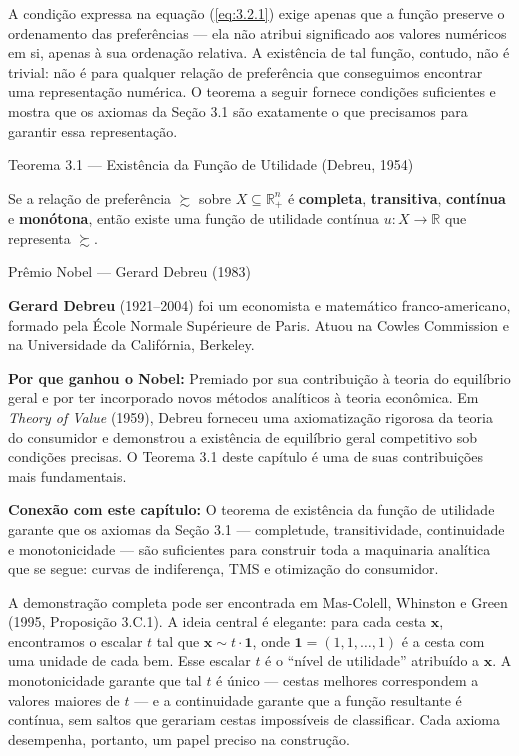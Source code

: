 \documentclass[11pt,twoside,openright]{book}
\begin{document}
A condição expressa na equação (\ref{eq:3.2.1}) exige apenas que a
função preserve o ordenamento das preferências --- ela não atribui
significado aos valores numéricos em si, apenas à sua ordenação
relativa. A existência de tal função, contudo, não é trivial: não é para
qualquer relação de preferência que conseguimos encontrar uma
representação numérica. O teorema a seguir fornece condições suficientes
e mostra que os axiomas da Seção 3.1 são exatamente o que precisamos
para garantir essa representação.

\begin{theorembox}{Teorema 3.1 — Existência da Função de Utilidade (Debreu, 1954)}

Se a relação de preferência \(\succsim\) sobre
\(X \subseteq \mathbb{R}^n_+\) é \textbf{completa}, \textbf{transitiva},
\textbf{contínua} e \textbf{monótona}, então existe uma função de
utilidade contínua \(u: X \to \mathbb{R}\) que representa \(\succsim\).

\end{theorembox}

\begin{infobox}{Prêmio Nobel — Gerard Debreu (1983)}

\textbf{Gerard Debreu} (1921--2004) foi um economista e matemático
franco-americano, formado pela École Normale Supérieure de Paris. Atuou
na Cowles Commission e na Universidade da Califórnia, Berkeley.

\textbf{Por que ganhou o Nobel:} Premiado por sua contribuição à teoria
do equilíbrio geral e por ter incorporado novos métodos analíticos à
teoria econômica. Em \emph{Theory of Value} (1959), Debreu forneceu uma
axiomatização rigorosa da teoria do consumidor e demonstrou a existência
de equilíbrio geral competitivo sob condições precisas. O Teorema 3.1
deste capítulo é uma de suas contribuições mais fundamentais.

\textbf{Conexão com este capítulo:} O teorema de existência da função de
utilidade garante que os axiomas da Seção 3.1 --- completude,
transitividade, continuidade e monotonicidade --- são suficientes para
construir toda a maquinaria analítica que se segue: curvas de
indiferença, TMS e otimização do consumidor.

\end{infobox}

A demonstração completa pode ser encontrada em Mas-Colell, Whinston e
Green (1995, Proposição 3.C.1). A ideia central é elegante: para cada
cesta \(\mathbf{x}\), encontramos o escalar \(t\) tal que
\(\mathbf{x} \sim t \cdot \mathbf{1}\), onde
\(\mathbf{1} = (1, 1, \ldots, 1)\) é a cesta com uma unidade de cada
bem. Esse escalar \(t\) é o ``nível de utilidade'' atribuído a
\(\mathbf{x}\). A monotonicidade garante que tal \(t\) é único ---
cestas melhores correspondem a valores maiores de \(t\) --- e a
continuidade garante que a função resultante é contínua, sem saltos que
gerariam cestas impossíveis de classificar. Cada axioma desempenha,
portanto, um papel preciso na construção.
\end{document}
